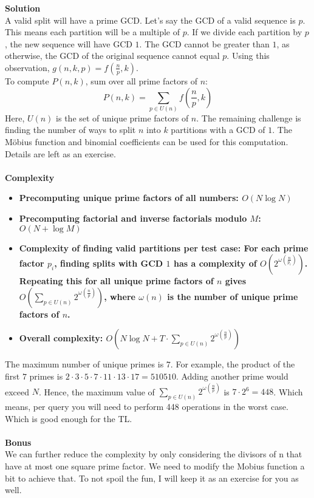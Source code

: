 {\bf{Solution}} \\
A valid split will have a prime GCD. Let’s say the GCD of a valid sequence is $p$. 
This means each partition will be a multiple of $p$. If we divide each partition by $p$, 
the new sequence will have GCD $1$. The GCD cannot be greater than $1$, 
as otherwise, the GCD of the original sequence cannot equal $p$. 
Using this observation, $g(n,k,p) = f(\frac{n}{p},k)$. \\
To compute $P(n,k)$, sum over all prime factors of $n$:
$$P(n,k) = \sum_{p \in U(n)} f\left(\frac{n}{p},k\right)$$
Here, $U(n)$ is the set of unique prime factors of $n$. 
The remaining challenge is finding the number of ways to split 
$n$ into $k$ partitions with a GCD of $1$. The Möbius function 
and binomial coefficients can be used for this computation. 
Details are left as an exercise. \\
\\
{\bf{Complexity}}
\begin{itemize}
  \item \bf{Precomputing unique prime factors of all numbers:} $O(N \log N)$
  \item \bf{Precomputing factorial and inverse factorials modulo $M$:} $O(N + \log M)$
  \item \bf{Complexity of finding valid partitions per test case:} 
  For each prime factor $p_i$, finding splits with GCD $1$ has a complexity of 
  $O(2^{\omega(\frac{n}{p_i})})$. Repeating this for all unique prime 
  factors of $n$ gives $O(\sum_{p \in U(n)} 2^{\omega(\frac{n}{p})})$, 
  where $\omega(n)$ is the number of unique prime factors of $n$.
  \item \bf{Overall complexity:} $O(N \log N + T \cdot \sum_{p \in U(n)} 2^{\omega(\frac{n}{p})})$
\end{itemize}
The maximum number of unique primes is $7$. For example, the product of the first 
$7$ primes is $2 \cdot 3 \cdot 5 \cdot 7 \cdot 11 \cdot 13 \cdot 17 = 510510$. 
Adding another prime would exceed $N$. Hence, the maximum value of 
$\sum_{p \in U(n)} 2^{\omega(\frac{n}{p})}$ is $7 \cdot 2^6 = 448$. 
Which means, per query you will need to perform 448 operations in the worst case. 
Which is good enough for the TL. \\
\\
{\bf{Bonus}} \\
We can further reduce the complexity by only considering the 
divisors of n that have at most one square prime factor. 
We need to modify the Mobius function a bit to achieve that. 
To not spoil the fun, I will keep it as an exercise for you as well.
